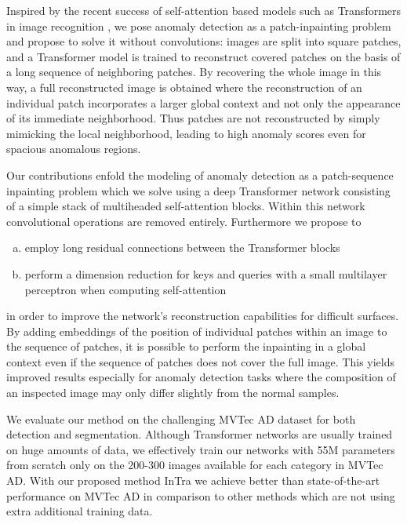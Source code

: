 \documentclass[final,5p,times,twocolumn]{elsarticle}
\begin{document}
	Inspired by the recent success of self-attention based models such as Transformers \cite{NIPS2017_3f5ee243} in image recognition \cite{dosovitskiy2020}, we pose anomaly detection as a patch-inpainting problem and propose to solve it without convolutions: images are split into square patches, and a Transformer model is trained to reconstruct covered patches on the basis of a long sequence of neighboring patches. By recovering the whole image in this way, a full reconstructed image is obtained where the reconstruction of an individual patch incorporates a larger global context and not only the appearance of its immediate neighborhood. Thus patches are not reconstructed by simply mimicking the local neighborhood, leading to high anomaly scores even for spacious anomalous regions.
	
	Our contributions enfold the modeling of anomaly detection as a patch-sequence inpainting problem which we solve using a deep Transformer network consisting of a simple stack of multiheaded self-attention blocks. Within this network convolutional operations are removed entirely. Furthermore we propose to
	\begin{enumerate}[a.)]
		\item employ long residual connections between the Transformer blocks
		\item perform a dimension reduction for keys and queries with a small multilayer perceptron when computing self-attention
	\end{enumerate}
	in order to improve the network's reconstruction capabilities for difficult surfaces. By adding embeddings of the position of individual patches within an image to the sequence of patches, it is possible to perform the inpainting in a global context even if the sequence of patches does not cover the full image. This yields improved results especially for anomaly detection tasks where the composition of an inspected image may only differ slightly from the normal samples.
	
	We evaluate our method on the challenging MVTec AD dataset for both detection and segmentation. Although Transformer networks are usually trained on huge amounts of data, we effectively train our networks with 55M parameters from scratch only on the 200-300 images available for each category in MVTec AD. With our proposed method InTra we achieve better than state-of-the-art performance on MVTec AD in comparison to other methods \cite{Yi_2020_ACCV,ZAVRTANIK2021107706,li2021cutpaste} which are not using extra additional training data.
	
\end{document}
